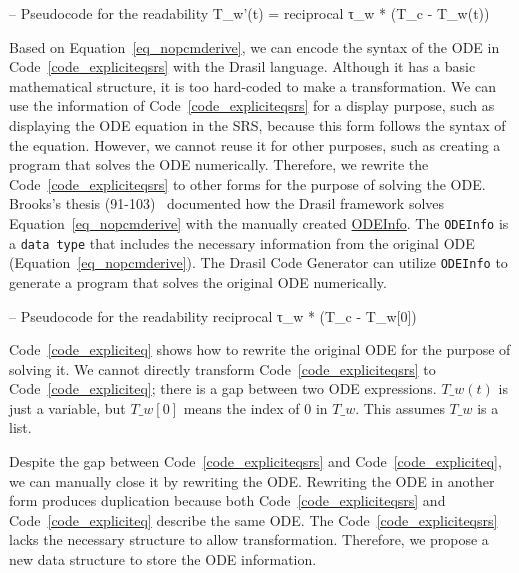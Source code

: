 \begin{listing}[ht]
\begin{haskell1}
-- Pseudocode for the readability
T_w'(t) = reciprocal τ_w * (T_c - T_w(t))
\end{haskell1}
\label{code_expliciteqsrs}
\end{listing}

Based on Equation~\ref{eq_nopcmderive}, we can encode the syntax of the ODE in Code~\ref{code_expliciteqsrs} with the Drasil language. Although it has a basic mathematical structure, it is too hard-coded to make a transformation. We can use the information of Code~\ref{code_expliciteqsrs} for a display purpose, such as displaying the ODE equation in the SRS, because this form follows the syntax of the equation. However, we cannot reuse it for other purposes, such as creating a program that solves the ODE numerically. Therefore, we rewrite the Code~\ref{code_expliciteqsrs} to other forms for the purpose of solving the ODE. Brooks's thesis (91-103)~\citep{brooks} documented how the Drasil framework solves Equation~\ref{eq_nopcmderive} with the manually created \href{https://jacquescarette.github.io/Drasil/docs/drasil-code-0.1.9.0/Language-Drasil-Code.html#t:ODEInfo}{ODEInfo}. The \verb|ODEInfo| is a \verb|data type| that includes the necessary information from the original ODE (Equation~\ref{eq_nopcmderive}). The Drasil Code Generator can utilize \verb|ODEInfo| to generate a program that solves the original ODE numerically. 
\begin{listing}[ht]
\begin{haskell1}
-- Pseudocode for the readability
reciprocal τ_w * (T_c - T_w[0])
\end{haskell1}
\label{code_expliciteq}
\end{listing}
Code~\ref{code_expliciteq} shows how to rewrite the original ODE for the purpose of solving it. We cannot directly transform Code~\ref{code_expliciteqsrs} to Code~\ref{code_expliciteq}; there is a gap between two ODE expressions. $T\_w(t)$ is just a variable, but $T\_w[0]$ means the index of $0$ in $T\_w$. This assumes $T\_w$ is a list.

Despite the gap between Code~\ref{code_expliciteqsrs} and Code~\ref{code_expliciteq}, we can manually close it by rewriting the ODE. Rewriting the ODE in another form produces duplication because both Code~\ref{code_expliciteqsrs} and Code~\ref{code_expliciteq} describe the same ODE. The Code~\ref{code_expliciteqsrs} lacks the necessary structure to allow transformation. Therefore, we propose a new data structure to store the ODE information.

